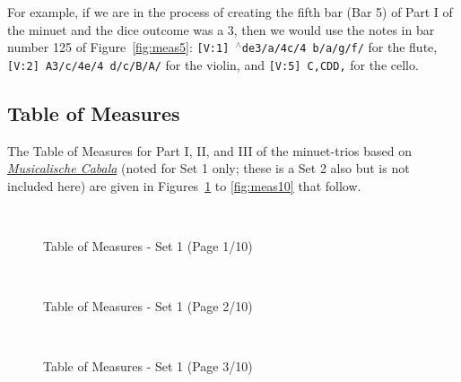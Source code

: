 \documentclass[a4paper,x11names,svgnames,10pt]{article}
\begin{document}
{For example, if we are in the process of creating the fifth bar (Bar 5) of Part I of the minuet and the dice outcome was a 3, then we would use the notes in bar number 125 of Figure~\ref{fig:meas5}: {\tt [V:1] {$^\wedge$d}e3/a/4c/4 b/a/g/f/} for the flute, {\tt [V:2] A3/c/4e/4 d/c/B/A/} for the violin, and {\tt [V:5] C,CDD,} for the cello.\\


\subsection{Table of Measures}\label{tabMeas}

The Table of Measures for Part I, II, and III of the minuet-trios based on \href{https://imslp.org/wiki/Musicalische_Cabala_(Schola\%2C_Franciscus)}{{\em Musicalische Cabala}} (noted for Set 1 only; these is a Set 2 also but is not included here) are given in Figures~\ref{fig:meas1} to  \ref{fig:meas10} that follow. 

${}_{}$\\
\begin{figure}[H]
	\centering
	\def\svgwidth{0.975\columnwidth}
 	
	\caption{Table of Measures - Set 1 (Page 1/10)}
	\label{fig:meas1}
\end{figure}

${}_{}$\\
\vspace*{0.5in}
\begin{figure}[H]
	\centering
	\def\svgwidth{0.975\columnwidth}
 	
	\caption{Table of Measures - Set 1 (Page 2/10)}
	\label{fig:meas2}
\end{figure}

${}_{}$\\
\vspace*{0.5in}
\begin{figure}[H]
	\centering
	\def\svgwidth{0.975\columnwidth}
 	
	\caption{Table of Measures - Set 1 (Page 3/10)}
	\label{fig:meas3}
\end{figure}

}
\end{document}
